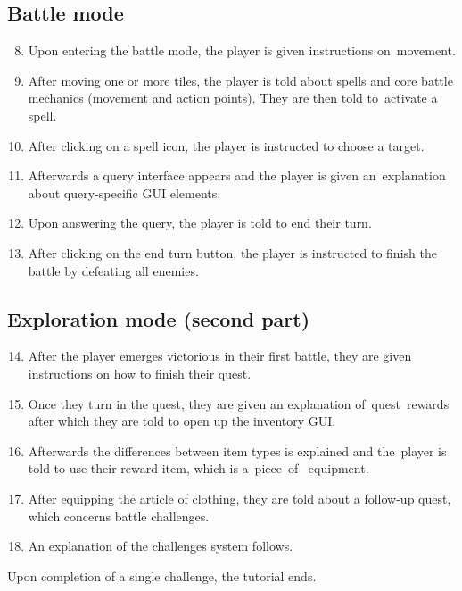 \documentclass[thesis=B,english,hidelinks]{FITthesisXE}[2012/06/26]
\begin{document}
\newpage

\subsection{Battle mode}

\begin{enumerate}
\setcounter{enumi}{7}
\item Upon entering the battle mode, the player is given instructions on~movement.
\item After moving one or more tiles, the player is told about spells and core battle mechanics (movement and action points). They are then told to~activate a spell.
\item After clicking on a spell icon, the player is instructed to choose a target.
\item Afterwards a query interface appears and the player is given an~explanation about query-specific GUI elements.
\item Upon answering the query, the player is told to end their turn.
\item After clicking on the end turn button, the player is instructed to finish the battle by defeating all enemies.
\end{enumerate}

\subsection{Exploration mode (second part)}

\begin{enumerate}
\setcounter{enumi}{13}
\item After the player emerges victorious in their first battle, they are given instructions on how to finish their quest.
\item Once they turn in the quest, they are given an explanation of~quest~rewards after which they are told to open up the inventory GUI.
\item Afterwards the differences between item types is explained and the~player is told to use their reward item, which is a~piece~of~ equipment.
\item After equipping the article of clothing, they are told about a follow-up quest, which concerns battle challenges.
\item An explanation of the challenges system follows.
\end{enumerate}

Upon completion of a single challenge, the tutorial ends.
\end{document}
